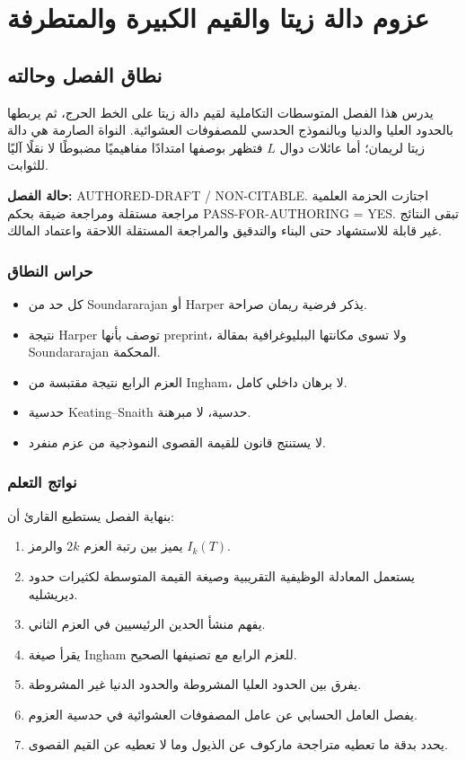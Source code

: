 \chapter{عزوم دالة زيتا والقيم الكبيرة والمتطرفة}
\label{ch:moments-extreme-values}

\section*{نطاق الفصل وحالته}

يدرس هذا الفصل المتوسطات التكاملية لقيم دالة زيتا على الخط الحرج، ثم يربطها بالحدود العليا والدنيا وبالنموذج الحدسي للمصفوفات العشوائية. النواة الصارمة هي دالة زيتا لريمان؛ أما عائلات دوال \(L\) فتظهر بوصفها امتدادًا مفاهيميًا مضبوطًا لا نقلًا آليًا للثوابت.

\noindent\textbf{حالة الفصل:}
\textenglish{AUTHORED-DRAFT / NON-CITABLE}. اجتازت الحزمة العلمية مراجعة مستقلة ومراجعة ضيقة بحكم \textenglish{PASS-FOR-AUTHORING = YES}. تبقى النتائج غير قابلة للاستشهاد حتى البناء والتدقيق والمراجعة المستقلة اللاحقة واعتماد المالك.

\subsection*{حراس النطاق}
\begin{itemize}
  \item كل حد من Soundararajan أو Harper يذكر فرضية ريمان صراحة.
  \item نتيجة Harper توصف بأنها \textenglish{preprint}، ولا تسوى مكانتها الببليوغرافية بمقالة Soundararajan المحكمة.
  \item العزم الرابع نتيجة مقتبسة من Ingham، لا برهان داخلي كامل.
  \item حدسية Keating--Snaith حدسية، لا مبرهنة.
  \item لا يستنتج قانون للقيمة القصوى النموذجية من عزم منفرد.
\end{itemize}

\subsection*{نواتج التعلم}
بنهاية الفصل يستطيع القارئ أن:
\begin{enumerate}
  \item يميز بين رتبة العزم \(2k\) والرمز \(I_k(T)\).
  \item يستعمل المعادلة الوظيفية التقريبية وصيغة القيمة المتوسطة لكثيرات حدود ديريشليه.
  \item يفهم منشأ الحدين الرئيسيين في العزم الثاني.
  \item يقرأ صيغة Ingham للعزم الرابع مع تصنيفها الصحيح.
  \item يفرق بين الحدود العليا المشروطة والحدود الدنيا غير المشروطة.
  \item يفصل العامل الحسابي عن عامل المصفوفات العشوائية في حدسية العزوم.
  \item يحدد بدقة ما تعطيه متراجحة ماركوف عن الذيول وما لا تعطيه عن القيم القصوى.
\end{enumerate}

